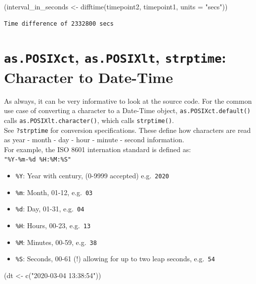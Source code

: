 \documentclass[
]{book}
\newenvironment{Shaded}{\begin{snugshade}}{\end{snugshade}}
\newcommand{\AttributeTok}[1]{\textcolor[rgb]{0.77,0.63,0.00}{#1}}
\newcommand{\FunctionTok}[1]{\textcolor[rgb]{0.00,0.00,0.00}{#1}}
\newcommand{\NormalTok}[1]{#1}
\newcommand{\OtherTok}[1]{\textcolor[rgb]{0.56,0.35,0.01}{#1}}
\newcommand{\StringTok}[1]{\textcolor[rgb]{0.31,0.60,0.02}{#1}}
\providecommand{\tightlist}{%
  \setlength{\itemsep}{0pt}\setlength{\parskip}{0pt}}
\begin{document}
\begin{Shaded}
\begin{Highlighting}[]
\NormalTok{(interval\_in\_seconds }\OtherTok{\textless{}{-}} \FunctionTok{difftime}\NormalTok{(timepoint2, timepoint1, }\AttributeTok{units =} \StringTok{"secs"}\NormalTok{))}
\end{Highlighting}
\end{Shaded}

\begin{verbatim}
Time difference of 2332800 secs
\end{verbatim}

\hypertarget{as.posixct-as.posixlt-strptime-character-to-date-time}{%
\section{\texorpdfstring{\texttt{as.POSIXct}, \texttt{as.POSIXlt}, \texttt{strptime}: Character to Date-Time}{as.POSIXct, as.POSIXlt, strptime: Character to Date-Time}}\label{as.posixct-as.posixlt-strptime-character-to-date-time}}

As always, it can be very informative to look at the source code. For the common use case of converting a character to a Date-Time object, \texttt{as.POSIXct.default()} calls \texttt{as.POSIXlt.character()}, which calls \texttt{strptime()}.\\
See \texttt{?strptime} for conversion specifications. These define how characters are read as year - month - day - hour - minute - second information.\\
For example, the ISO 8601 internation standard is defined as:\\
\texttt{"\%Y-\%m-\%d\ \%H:\%M:\%S"}

\begin{itemize}
\tightlist
\item
  \texttt{\%Y}: Year with century, (0-9999 accepted) e.g.~\texttt{2020}
\item
  \texttt{\%m}: Month, 01-12, e.g.~\texttt{03}
\item
  \texttt{\%d}: Day, 01-31, e.g.~\texttt{04}
\item
  \texttt{\%H}: Hours, 00-23, e.g.~\texttt{13}
\item
  \texttt{\%M}: Minutes, 00-59, e.g.~\texttt{38}
\item
  \texttt{\%S}: Seconds, 00-61 (!) allowing for up to two leap seconds, e.g.~\texttt{54}
\end{itemize}

\begin{Shaded}
\begin{Highlighting}[]
\NormalTok{(dt }\OtherTok{\textless{}{-}} \FunctionTok{c}\NormalTok{(}\StringTok{"2020{-}03{-}04 13:38:54"}\NormalTok{))}
\end{Highlighting}
\end{Shaded}
\end{document}
